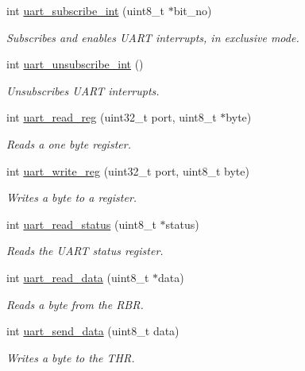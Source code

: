 \begin{DoxyCompactItemize}
\item 
int \mbox{\hyperlink{group__uart_gac0d5ac077c28fa582ed60b1c3d977d83}{uart\+\_\+subscribe\+\_\+int}} (uint8\+\_\+t $\ast$bit\+\_\+no)
\begin{DoxyCompactList}\small\item\em Subscribes and enables U\+A\+RT interrupts, in exclusive mode. \end{DoxyCompactList}\item 
int \mbox{\hyperlink{group__uart_gaf1ff3ad84fc50b3da2bf271b569af0da}{uart\+\_\+unsubscribe\+\_\+int}} ()
\begin{DoxyCompactList}\small\item\em Unsubscribes U\+A\+RT interrupts. \end{DoxyCompactList}\item 
int \mbox{\hyperlink{group__uart_ga072a4cc00030540e86ac100c8e7c8902}{uart\+\_\+read\+\_\+reg}} (uint32\+\_\+t port, uint8\+\_\+t $\ast$byte)
\begin{DoxyCompactList}\small\item\em Reads a one byte register. \end{DoxyCompactList}\item 
int \mbox{\hyperlink{group__uart_ga59c922bd359845f14061ced67e74c6b3}{uart\+\_\+write\+\_\+reg}} (uint32\+\_\+t port, uint8\+\_\+t byte)
\begin{DoxyCompactList}\small\item\em Writes a byte to a register. \end{DoxyCompactList}\item 
int \mbox{\hyperlink{group__uart_ga2489cf587ed0d39db2aafebba69d6b6d}{uart\+\_\+read\+\_\+status}} (uint8\+\_\+t $\ast$status)
\begin{DoxyCompactList}\small\item\em Reads the U\+A\+RT status register. \end{DoxyCompactList}\item 
int \mbox{\hyperlink{group__uart_ga25bafed3ff787360a644c19f0e5acd26}{uart\+\_\+read\+\_\+data}} (uint8\+\_\+t $\ast$data)
\begin{DoxyCompactList}\small\item\em Reads a byte from the R\+BR. \end{DoxyCompactList}\item 
int \mbox{\hyperlink{group__uart_gae1d1c17871aeba317b0582a22006aa94}{uart\+\_\+send\+\_\+data}} (uint8\+\_\+t data)
\begin{DoxyCompactList}\small\item\em Writes a byte to the T\+HR. \end{DoxyCompactList}\item 

\end{DoxyCompactItemize}
